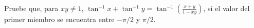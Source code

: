 \item Pruebe que, para $xy \ne 1$, $\tan^{-1} x + \tan^{-1} y = \tan^{-1} \left( \frac{x + y}{1 - xy} \right)$, si el valor del primer miembro se encuentra entre $-\pi/2$ y $\pi/2$.
